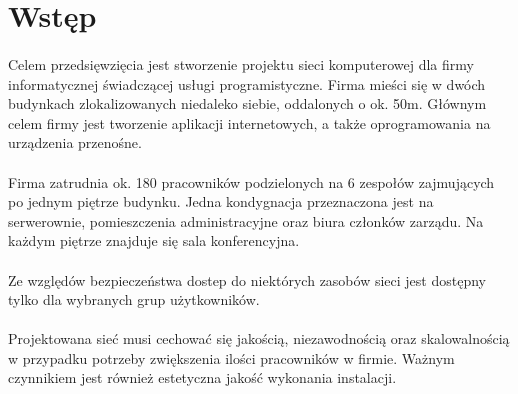 \section{Wstęp}

\paragraph{}
Celem przedsięwzięcia jest stworzenie projektu sieci komputerowej dla firmy informatycznej świadczącej usługi programistyczne.
Firma mieści się w dwóch budynkach zlokalizowanych niedaleko siebie, oddalonych o ok. 50m.
Głównym celem firmy jest tworzenie aplikacji internetowych, a także oprogramowania na urządzenia przenośne.


\paragraph{}
Firma zatrudnia ok. 180 pracowników podzielonych na 6 zespołów zajmujących po jednym piętrze budynku.
Jedna kondygnacja przeznaczona jest na serwerownie, pomieszczenia administracyjne oraz biura członków zarządu.
Na każdym piętrze znajduje się sala konferencyjna.

\paragraph{}
Ze względów bezpieczeństwa dostep do niektórych zasobów sieci jest dostępny tylko dla wybranych grup użytkowników.

\paragraph{}
Projektowana sieć musi cechować się jakością, niezawodnością oraz skalowalnością w przypadku potrzeby zwiększenia ilości pracowników w firmie. Ważnym czynnikiem jest również estetyczna jakość wykonania instalacji.

